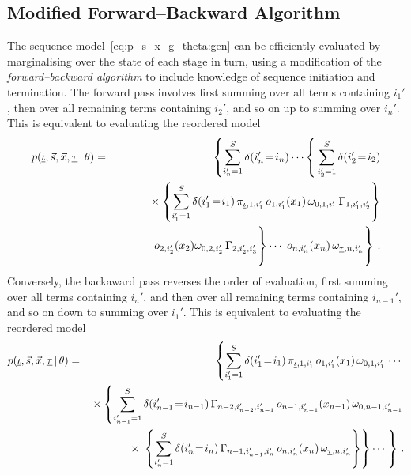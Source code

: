 \documentclass[a4paper]{article}
\newcommand{\ui}{\underline{\iota}}
\newcommand{\ut}{\underline{\tau}}
\begin{document}
\subsection{Modified Forward--Backward Algorithm}\label{sec:forward-backward}

The sequence model~\eqref{eq:p_s_x_g_theta:gen} can be efficiently evaluated by marginalising over the state of each stage
in turn, using a modification of the {\em forward--backward algorithm} to include knowledge of
sequence initiation and termination.
 The forward pass involves first summing over all terms containing $i_1'$, then over all remaining terms containing $i_2'$,
and so on up to summing over $i_n'$. This is equivalent to evaluating the reordered model
\begin{eqnarray}
   p(\ui,\vec{s},\vec{x},\ut\,|\,\theta) 
& = & 
   \left\{\sum_{i_n'=1}^{S}\delta(i_n'\!=\!i_n)
\cdots
\right\{\sum_{i_2'=1}^{S}\delta(i_2'\!=\!i_2)
\nonumber\\&&
\hspace*{10mm}{}\times
\left\{\sum_{i_1'=1}^{S}\delta(i_1'\!=\!i_1)\,
\pi_{\ui,1,i_1'}\,o_{1,i_1'}(x_1)\,\omega_{0,1,i_1'}\,\Gamma_{1,i_1',i_{2}'}\right\}
\nonumber\\&&
\left.\rule{0pt}{7mm}
o_{2,i_{2}'}(x_{2})\omega_{0,2,i_{2}'}\,\Gamma_{2,i_{2}',i_{3}'}\right\}
\cdots
\left.\rule{0pt}{7mm}\,o_{n,i_{n}'}(x_{n})
\,\omega_{\ut,n,i_n'}\right\}
\,.
\label{eq:forward}
\end{eqnarray}
Conversely, the backaward pass reverses the order of evaluation, first summing over all terms containing $i_n'$,
and then over all remaining terms containing $i_{n-1}'$, and so on down to summing over $i_1'$.
This is equivalent to evaluating the reordered model
\begin{eqnarray}
   p(\ui,\vec{s},\vec{x},\ut\,|\,\theta) 
& = & 
   \left\{\sum_{i_1'=1}^{S}\delta(i_1'\!=\!i_1)\,
\pi_{\ui,1,i_1'}\,o_{1,i_1'}(x_1)\,\omega_{0,1,i'_{1}}\,
\cdots\right.
\nonumber\\&&
{}\times\left\{\sum_{i_{n-1}'=1}^{S}\delta(i_{n-1}'\!=\!i_{n-1})\,
\Gamma_{n-2,i_{n-2}',i_{n-1}'}\,o_{n-1,i_{n-1}'}(x_{n-1})\,\omega_{0,n-1,i'_{n-1}}\right.
\nonumber\\&&
\hspace*{4mm}{}\times
\left.\rule{0pt}{7mm}\left\{\sum_{i_n'=1}^{S}\delta(i_n'\!=\!i_n)\,
\Gamma_{n-1,i_{n-1}',i_{n}'}\,o_{n,i_{n}'}(x_{n})
\,\omega_{\ut,n,i_n'}\right\}\right\}
\cdots\left.\rule{0pt}{7mm}\right\}
\,.
\label{eq:backward}
\end{eqnarray}
\end{document}
